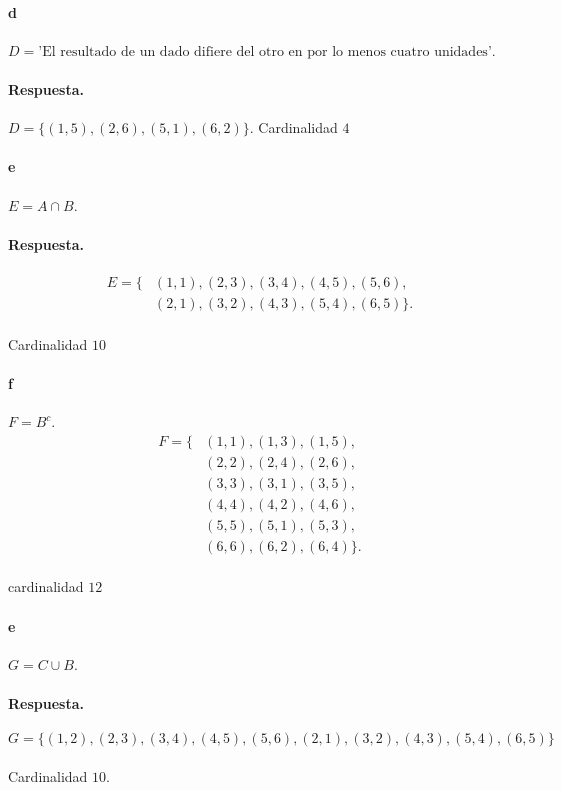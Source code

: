 \documentclass{article}
\begin{document}
\paragraph{d} $D = \text{'El resultado de un dado difiere del otro en por lo menos cuatro unidades'}$.
\paragraph{Respuesta.} $D = \{ (1,5), (2,6), (5,1), (6,2) \}.$ Cardinalidad $4$
\paragraph{e} $E = A \cap B$.
\paragraph{Respuesta.}
\begin{align*}
    E = \{ &(1,1), (2,3), (3,4), (4,5), (5,6),\\
           &(2,1), (3,2), (4,3), (5,4), (6,5) \}.
\end{align*}
\paragraph{} Cardinalidad $10$
\paragraph{f} $F = B^{c}$.
\begin{align*}
    F = \{ &(1,1), (1,3), (1,5),\\
           &(2,2), (2,4), (2,6),\\
           &(3,3), (3,1), (3,5),\\
           &(4,4), (4,2), (4,6),\\
           &(5,5), (5,1), (5,3),\\
           &(6,6), (6,2), (6,4) \}.
\end{align*}
\paragraph{} cardinalidad $12$
\paragraph{e} $G = C \cup B$.
\paragraph{Respuesta.}
$$G=\{(1,2), (2,3), (3,4), (4,5), (5,6), (2,1), (3,2), (4,3), (5,4), (6,5) \}$$
\paragraph{} Cardinalidad $10$.
\end{document}
